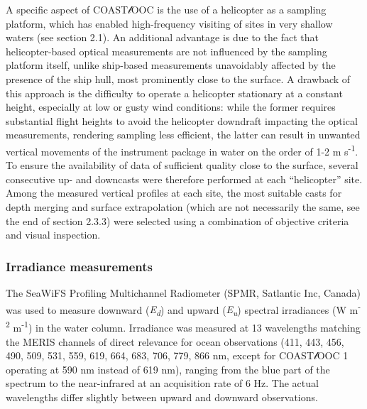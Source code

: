 \documentclass[essd, manuscript]{copernicus}
\begin{document}
A specific aspect of COAST$\mathscr{l}$OOC is the use of a helicopter as a sampling platform, which has enabled high-frequency visiting of sites in very shallow waters (see section 2.1). An additional advantage is due to the fact that helicopter-based optical measurements are not influenced by the sampling platform itself, unlike ship-based measurements unavoidably affected by the presence of the ship hull, most prominently close to the surface. A drawback of this approach is the difficulty to operate a helicopter stationary at a constant height, especially at low or gusty wind conditions: while the former requires substantial flight heights to avoid the helicopter downdraft impacting the optical measurements, rendering sampling less efficient, the latter can result in unwanted vertical movements of the instrument package in water on the order of 1-2 m s\textsuperscript{-1}. To ensure the availability of data of sufficient quality close to the surface, several consecutive up- and downcasts were therefore performed at each “helicopter” site. Among the measured vertical profiles at each site, the most suitable casts for depth merging and surface extrapolation (which are not necessarily the same, see the end of section 2.3.3) were selected using a combination of objective criteria and visual inspection.

\subsubsection{Irradiance measurements}

The SeaWiFS Profiling Multichannel Radiometer (SPMR, Satlantic Inc, Canada) was used to measure downward (\textit{E\textsubscript{d}}) and upward (\textit{E\textsubscript{u}}) spectral irradiances (W m\textsuperscript{-2} \textmu m\textsuperscript{-1}) in the water column. Irradiance was measured at 13 wavelengths matching the MERIS channels of direct relevance for ocean observations (411, 443, 456, 490, 509, 531, 559, 619, 664, 683, 706, 779, 866 nm, except for COAST$\mathscr{l}$OOC 1 operating at 590 nm instead of 619 nm), ranging from the blue part of the spectrum to the near-infrared at an acquisition rate of 6 Hz. The actual wavelengths differ slightly between upward and downward observations.
\end{document}
